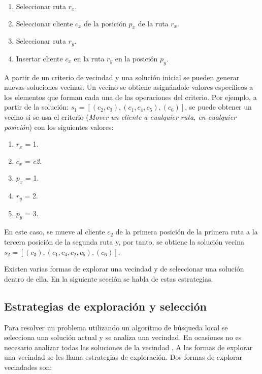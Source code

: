 \begin{enumerate}
	\item Seleccionar ruta \texttt{$r_x$}.
	\item Seleccionar cliente \texttt{$c_x$} de la posición \texttt{$p_x$} de la ruta \texttt{$r_x$}.
	\item Seleccionar ruta \texttt{$r_y$}.
	\item Insertar cliente \texttt{$c_x$} en la ruta \texttt{$r_y$} en la posición \texttt{$p_y$}.
\end{enumerate}

A partir de un criterio de vecindad y una solución inicial se pueden generar nuevas soluciones vecinas. Un vecino se obtiene asignándole valores específicos a los elementos que forman cada una de las operaciones del criterio. Por ejemplo, a partir de la solución: $s_1 = [(c_2,c_3), (c_1,c_4,c_5), (c_6)]$, se puede obtener un vecino si se usa el criterio (\textit{Mover un cliente a cualquier ruta, en cualquier posición}) con los siguientes valores:

\begin{enumerate}
	\item \texttt{$r_x$} = 1.
	\item \texttt{$c_x$} = \textit{c2}.
	\item \texttt{$p_x$} = 1.
	\item \texttt{$r_y$} = 2.
	\item \texttt{$p_y$} = 3. 
\end{enumerate}

En este caso, se mueve al cliente $c_2$ de la primera posición de la primera ruta a la tercera posición de la segunda ruta y, por tanto, se obtiene la solución vecina $s_2 = [(c_3), (c_1,c_4,c_2, c_5), (c_6)]$.

Existen varias formas de explorar una vecindad y de seleccionar una solución dentro de ella. En la siguiente sección se habla de estas estrategias.

\subsection{Estrategias de exploración y selección}
Para resolver un problema utilizando un algoritmo de búsqueda local se selecciona una solución actual y se analiza una vecindad. En ocasiones no es necesario analizar todas las soluciones de la vecindad \cite{Alina2017,Heidy}. A las formas de explorar una vecindad se les llama estrategias de exploración. Dos formas de explorar vecindades son:

